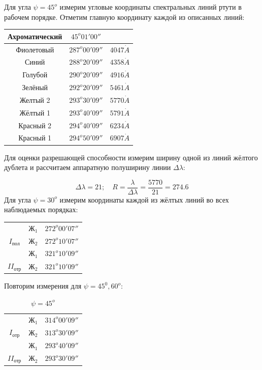 \documentclass[a4paper, 12pt]{article}%
\begin{document}
	
Для угла $\psi = 45^o$ измерим угловые координаты спектральных линий ртути в рабочем порядке. Отметим главную координату каждой из описанных линий:
\begin{table}[H]
	\centering
	\begin{tabular}{|c|c|c|}  \hline
		Ахроматический & $45^o 01' 00''$ & {} \\\hline
		Фиолетовый & $287^o 00' 09''$ & $4047 \dot A$ \\\hline
		Синий & $288^o 20' 09''$ & $4358 \dot A$ \\\hline
		Голубой & $290^o20'09''$ & $4916 \dot A$ \\\hline
		Зелёный & $292^o20'09''$ & $5461 \dot A$ \\\hline
		Желтый 2 & $293^o 30' 09''$ & $5770 \dot A$ \\\hline
		Жёлтый 1 & $293^o 40'09''$ & $5791 \dot A$ \\\hline
		Красный 2 & $294^o 40' 09''$ & $6234 \dot A$ \\\hline
		Красный 1 & $294^o 50'09''$ & $6907 \dot A$ \\\hline
	\end{tabular}
\end{table}
Для оценки разрешающей способности измерим ширину одной из линий жёлтого дублета и рассчитаем аппаратную полуширину линии $\Delta \lambda$:

\begin{equation}
\Delta \lambda = 21; \quad R = \frac{\lambda}{\Delta \lambda} =\frac{5770}{21} =  274.6
\end{equation}
Для угла $\psi = 30^o$ измерим координаты каждой из жёлтых линий во всех наблюдаемых порядках:
\begin{table}[H]
	\begin{center}
		\begin{tabular}{|c|c|c|} \hline
			& $Ж_1$ & $272^o00'07''$ \\
			\cline{2-3}
			$I_{пол}$
			& $Ж_2$ & $272^o 10'07''$ \\\hline
			& $Ж_1$ & $321^o10'09''$ \\
			\cline{2-3}
			$II_{отр}$
			& $Ж_2$ & $321^o10'09''$ \\\hline
		\end{tabular}
	\end{center}
\end{table}
Повторим измерения для $\psi = 45^0, 60^o$:

\begin{table}[H]	
	\begin{center}
		\begin{tabular}{|c|c|c|} \hline
			& $Ж_1$ & $314^o 00'09''$\\
			\cline{2-3}
			$I_{отр}$
			& $Ж_2$ & $313^o30'09''$ \\\hline
			& $Ж_1$ & $293^o40'09''$ \\
			\cline{2-3}
			$II_{отр}$
			& $Ж_2$ & $293^o30'09''$ \\\hline
		\end{tabular}
		\caption{$\psi = 45^o$}
	\end{center}
\end{table}
\end{document}
